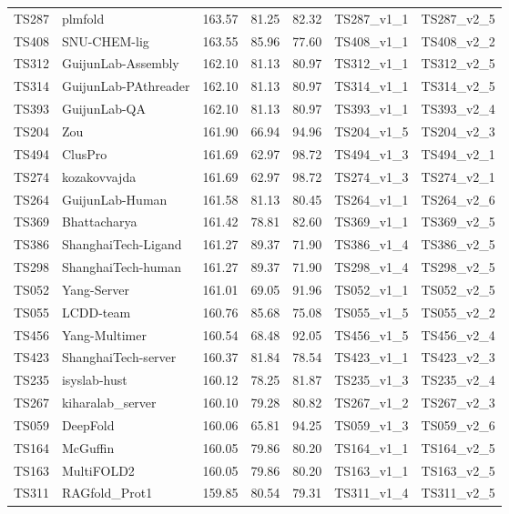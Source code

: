 \begin{table}[ht]
{\begin{tabular}{llrrrll}
TS287 & plmfold & 163.57 & 81.25 & 82.32 & TS287\_v1\_1 & TS287\_v2\_5 \\ 
TS408 & SNU-CHEM-lig & 163.55 & 85.96 & 77.60 & TS408\_v1\_1 & TS408\_v2\_2 \\ 
TS312 & GuijunLab-Assembly & 162.10 & 81.13 & 80.97 & TS312\_v1\_1 & TS312\_v2\_5 \\ 
TS314 & GuijunLab-PAthreader & 162.10 & 81.13 & 80.97 & TS314\_v1\_1 & TS314\_v2\_5 \\ 
TS393 & GuijunLab-QA & 162.10 & 81.13 & 80.97 & TS393\_v1\_1 & TS393\_v2\_4 \\ 
TS204 & Zou & 161.90 & 66.94 & 94.96 & TS204\_v1\_5 & TS204\_v2\_3 \\ 
TS494 & ClusPro & 161.69 & 62.97 & 98.72 & TS494\_v1\_3 & TS494\_v2\_1 \\ 
TS274 & kozakovvajda & 161.69 & 62.97 & 98.72 & TS274\_v1\_3 & TS274\_v2\_1 \\ 
TS264 & GuijunLab-Human & 161.58 & 81.13 & 80.45 & TS264\_v1\_1 & TS264\_v2\_6 \\ 
TS369 & Bhattacharya & 161.42 & 78.81 & 82.60 & TS369\_v1\_1 & TS369\_v2\_5 \\ 
TS386 & ShanghaiTech-Ligand & 161.27 & 89.37 & 71.90 & TS386\_v1\_4 & TS386\_v2\_5 \\ 
TS298 & ShanghaiTech-human & 161.27 & 89.37 & 71.90 & TS298\_v1\_4 & TS298\_v2\_5 \\ 
TS052 & Yang-Server & 161.01 & 69.05 & 91.96 & TS052\_v1\_1 & TS052\_v2\_5 \\ 
TS055 & LCDD-team & 160.76 & 85.68 & 75.08 & TS055\_v1\_5 & TS055\_v2\_2 \\ 
TS456 & Yang-Multimer & 160.54 & 68.48 & 92.05 & TS456\_v1\_5 & TS456\_v2\_4 \\ 
TS423 & ShanghaiTech-server & 160.37 & 81.84 & 78.54 & TS423\_v1\_1 & TS423\_v2\_3 \\ 
TS235 & isyslab-hust & 160.12 & 78.25 & 81.87 & TS235\_v1\_3 & TS235\_v2\_4 \\ 
TS267 & kiharalab\_server & 160.10 & 79.28 & 80.82 & TS267\_v1\_2 & TS267\_v2\_3 \\ 
TS059 & DeepFold & 160.06 & 65.81 & 94.25 & TS059\_v1\_3 & TS059\_v2\_6 \\ 
TS164 & McGuffin & 160.05 & 79.86 & 80.20 & TS164\_v1\_1 & TS164\_v2\_5 \\ 
TS163 & MultiFOLD2 & 160.05 & 79.86 & 80.20 & TS163\_v1\_1 & TS163\_v2\_5 \\ 
TS311 & RAGfold\_Prot1 & 159.85 & 80.54 & 79.31 & TS311\_v1\_4 & TS311\_v2\_5 \\ 

\end{tabular}}
\end{table}
